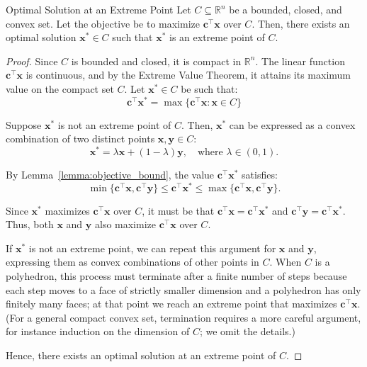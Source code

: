 \begin{theorem}{Optimal Solution at an Extreme Point}
\label{thm:extreme_point_optimum}
Let \(C \subseteq \mathbb{R}^n\) be a bounded, closed, and convex set. Let the objective be to maximize \(\mathbf{c}^\top \mathbf{x}\) over \(C\). Then, there exists an optimal solution \(\mathbf{x}^* \in C\) such that \(\mathbf{x}^*\) is an extreme point of \(C\).
\end{theorem}

\begin{proof}
Since \(C\) is bounded and closed, it is compact in \(\mathbb{R}^n\). The linear function \(\mathbf{c}^\top \mathbf{x}\) is continuous, and by the Extreme Value Theorem, it attains its maximum value on the compact set \(C\). Let \(\mathbf{x}^* \in C\) be such that:
\[
\mathbf{c}^\top \mathbf{x}^* = \max \{ \mathbf{c}^\top \mathbf{x} : {\mathbf{x} \in C} \}
\]

Suppose \(\mathbf{x}^*\) is not an extreme point of \(C\). Then, \(\mathbf{x}^*\) can be expressed as a convex combination of two distinct points \(\mathbf{x}, \mathbf{y} \in C\):
\[
\mathbf{x}^* = \lambda \mathbf{x} + (1-\lambda) \mathbf{y}, \quad \text{where } \lambda \in (0, 1).
\]

By Lemma~\ref{lemma:objective_bound}, the value \(\mathbf{c}^\top \mathbf{x}^*\) satisfies:
\[
\min\{\mathbf{c}^\top \mathbf{x}, \mathbf{c}^\top \mathbf{y}\} \leq \mathbf{c}^\top \mathbf{x}^* \leq \max\{\mathbf{c}^\top \mathbf{x}, \mathbf{c}^\top \mathbf{y}\}.
\]

Since \(\mathbf{x}^*\) maximizes \(\mathbf{c}^\top \mathbf{x}\) over \(C\), it must be that \(\mathbf{c}^\top \mathbf{x} = \mathbf{c}^\top \mathbf{x}^*\) and \(\mathbf{c}^\top \mathbf{y} = \mathbf{c}^\top \mathbf{x}^*\). Thus, both \(\mathbf{x}\) and \(\mathbf{y}\) also maximize \(\mathbf{c}^\top \mathbf{x}\) over \(C\).

If \(\mathbf{x}^*\) is not an extreme point, we can repeat this argument for \(\mathbf{x}\) and \(\mathbf{y}\), expressing them as convex combinations of other points in \(C\). When \(C\) is a polyhedron, this process must terminate after a finite number of steps because each step moves to a face of strictly smaller dimension and a polyhedron has only finitely many faces; at that point we reach an extreme point that maximizes \(\mathbf{c}^\top \mathbf{x}\). (For a general compact convex set, termination requires a more careful argument, for instance induction on the dimension of \(C\); we omit the details.)

Hence, there exists an optimal solution at an extreme point of \(C\).
\end{proof}

